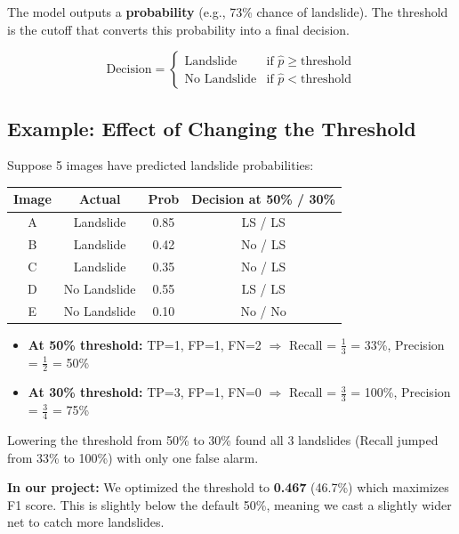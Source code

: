 \documentclass[11pt]{article}
\begin{document}
The model outputs a \textbf{probability} (e.g., 73\% chance of landslide).
The threshold is the cutoff that converts this probability into a final decision.

\[
\text{Decision} =
\begin{cases}
    \text{Landslide}     & \text{if } \hat{p} \geq \text{threshold} \\
    \text{No Landslide}  & \text{if } \hat{p} < \text{threshold}
\end{cases}
\]

\subsection{Example: Effect of Changing the Threshold}

Suppose 5 images have predicted landslide probabilities:

\begin{center}
\begin{tabular}{cccc}
\toprule
\textbf{Image} & \textbf{Actual} & \textbf{Prob} & \textbf{Decision at 50\% / 30\%} \\ \midrule
A & Landslide    & 0.85 & LS / LS \\
B & Landslide    & 0.42 & No / LS \\
C & Landslide    & 0.35 & No / LS \\
D & No Landslide & 0.55 & LS / LS \\
E & No Landslide & 0.10 & No / No \\
\bottomrule
\end{tabular}
\end{center}

\begin{itemize}[noitemsep]
    \item \textbf{At 50\% threshold:} TP=1, FP=1, FN=2 $\Rightarrow$ Recall = $\frac{1}{3}$ = 33\%, Precision = $\frac{1}{2}$ = 50\%
    \item \textbf{At 30\% threshold:} TP=3, FP=1, FN=0 $\Rightarrow$ Recall = $\frac{3}{3}$ = 100\%, Precision = $\frac{3}{4}$ = 75\%
\end{itemize}

\noindent Lowering the threshold from 50\% to 30\% found all 3 landslides (Recall jumped from 33\% to 100\%) with only one false alarm.

\medskip
\noindent\textbf{In our project:} We optimized the threshold to \textbf{0.467} (46.7\%) which maximizes F1 score.
This is slightly below the default 50\%, meaning we cast a slightly wider net to catch more landslides.
\end{document}
